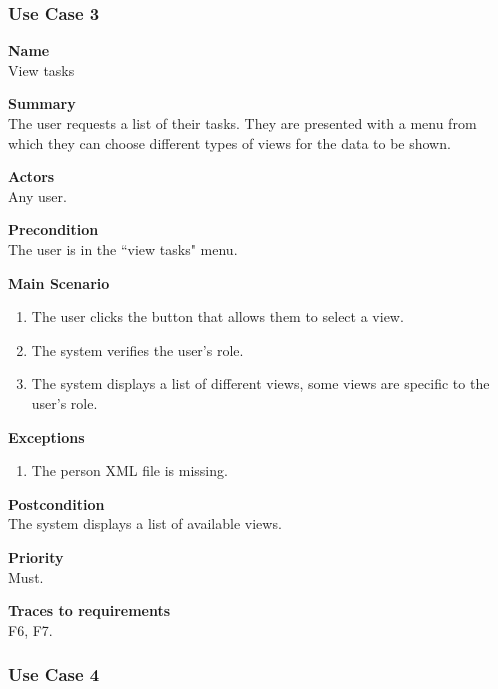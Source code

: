 \documentclass[12pt]{article}
\begin{document}
\subsubsection{Use Case 3} \label{uc:3}

\noindent
{\bf Name}\\
View tasks

\noindent
{\bf Summary}\\
The user requests a list of their tasks. They are presented with a menu from which they can choose different types of views for the data to be shown.

\noindent
{\bf Actors}\\
Any user.

\noindent
{\bf Precondition}\\
The user is in the ``view tasks" menu.

\noindent
{\bf Main Scenario}\\
\vspace*{-0.35in}
\begin{enumerate}
\item The user clicks the button that allows them to select a view.
\vspace*{-0.1in}
\item The system verifies the user's role.
\vspace*{-0.1in}
\item The system displays a list of different views, some views are specific to the user's role.
\end{enumerate}
\vspace*{-0.1in}

\noindent
{\bf Exceptions}\\
\vspace*{-0.35in}
\begin{enumerate}
\item The person XML file is missing.
\end{enumerate}
\vspace*{-0.1in}

\noindent
{\bf Postcondition}\\
The system displays a list of available views.

\noindent
{\bf Priority}\\
Must.

\noindent
{\bf Traces to requirements}\\
F6, F7.

\subsubsection{Use Case 4} \label{uc:4}
\end{document}
